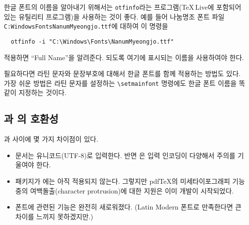 한글 폰트의 이름을 알아내기 위해서는 \texttt{otfinfo}라는 프로그램(\TeX\,Live에 포함되어 있는 유틸리티 프로그램)을 사용하는 것이 좋다. 예를 들어 
나눔명조 폰트 파일
\texttt{C:\bs Windows\bs Fonts\bs NanumMyeongjo.ttf}\allowbreak 에 대하여 이 명령을 
\begin{verbatim}
  otfinfo -i "C:\Windows\Fonts\NanumMyeongjo.ttf"
\end{verbatim}
적용하면 ``Full Name''을 알려준다. 되도록 여기에 표시되는 이름을 사용하여야 한다.

필요하다면 라틴 문자와 문장부호에 대해서 한글 폰트를 함께 적용하는 방법도 있다. 가장 쉬운 방법은 
라틴 문자를 설정하는 \verb|\setmainfont| 명령에도 한글 폰트 이름을 똑같이 지정하는 것이다. 

\subsection{\XeLaTeX 과 의 호환성}

\XeLaTeX 과  사이에 몇 가지 차이점이 있다.

\begin{itemize}
\item \XeLaTeX{} 문서는 유니코드(UTF-8)로 입력한다. 반면 은
입력 인코딩이 다양해서 주의를 기울여야 한다.%
\item {} 패키지가 에는 아직 적용되지 않는다. 그렇지만 pdf\TeX 의 미세타이포그래피 기능 중의 여백돌출(character protrusion)에 대한 지원은 이미 개발이 시작되었다.
\item 폰트에 관련된 기능은 완전히 새로워졌다. (Latin Modern 폰트로 만족한다면 큰 차이를 느끼지 못하겠지만.)
\end{itemize}

